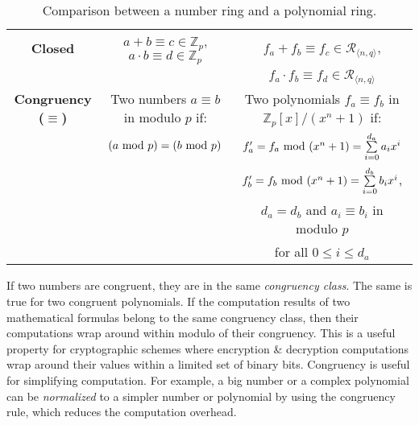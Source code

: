 \begin{table}[h]
{\begin{tabular}{|c||c|c|}
\textbf{{Closed}}& $a + b \equiv c \in \mathbb{Z}_p$, $a \cdot b \equiv d \in \mathbb{Z}_p$ & $f_a + f_b \equiv f_c \in \mathcal{R}_{\langle n, q \rangle}$, \\
&&$f_a \cdot f_b \equiv f_d \in \mathcal{R}_{\langle n, q \rangle}$\\
\hline
\textbf{{Congruency ($\equiv$)}} & Two numbers $a \equiv b$ in modulo $p$ if: & Two polynomials $f_a \equiv f_b$ in $\mathbb{Z}_p[x] / (x^n + 1)$ if:    \\
 & $(a \text{ } \text{\text{mod}} \text{ } p) = (b \text{ } \text{\text{mod}} \text{ } p)$   & $f'_a = f_a \text{ } \text{\text{mod}} \text{ } (x^n + 1) = \sum\limits_{i=0}^{d_a} a_ix^i$ \\
 & & $f'_b = f_b \text{ } \text{\text{mod}} \text{ } (x^n + 1) = \sum\limits_{i=0}^{d_b} b_ix^i$, \\
&& $d_a = d_b$ and $a_i \equiv b_i$ in modulo $p$\\
&&for all $0 \leq i \leq d_a$\\ 
\hline
\end{tabular}}
\centering
\caption{Comparison between a number ring and a polynomial ring.
}
\label{tab:ring-comparison}
\end{table}

 If two numbers are congruent, they are in the same \textit{congruency class}. The same is true for two congruent polynomials. If the computation results of two mathematical formulas belong to the same congruency class, then their computations wrap around within modulo of their congruency. This is a useful property for cryptographic schemes where encryption \& decryption computations wrap around their values within a limited set of binary bits. Congruency is useful for simplifying computation. For example, a big number or a complex polynomial can be \textit{normalized} to a simpler number or polynomial by using the congruency rule, which reduces the computation overhead. 

